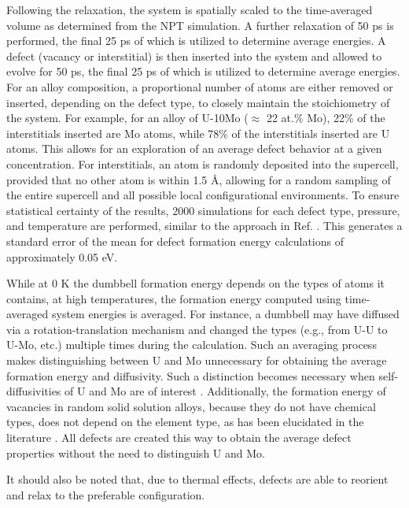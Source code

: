 \documentclass[review]{elsarticle}
\begin{document}
Following the relaxation, the system is spatially scaled to the time-averaged volume as determined from the NPT simulation. A further relaxation of 50 ps is performed, the final 25 ps of which is utilized to determine average energies. A defect (vacancy or interstitial) is then inserted into the system and allowed to evolve for 50 ps, the final 25 ps of which is utilized to determine average energies. For an alloy composition, a proportional number of atoms are either removed or inserted, depending on the defect type, to closely maintain the stoichiometry of the system. For example, for an alloy of U-10Mo ($\approx$ 22 at.\% Mo), 22\% of the interstitials inserted are Mo atoms, while 78\% of the interstitials inserted are U atoms. This allows for an exploration of an average defect behavior at a given concentration. For interstitials, an atom is randomly deposited into the supercell, provided that no other atom is within 1.5 \r{A}, allowing for a random sampling of the entire supercell and all possible local configurational environments. To ensure statistical certainty of the results, 2000 simulations for each defect type, pressure, and temperature are performed, similar to the approach in Ref. \cite{zhang2021}. This generates a standard error of the mean for defect formation energy calculations of approximately 0.05 eV. 

While at 0 K the dumbbell formation energy depends on the types of atoms it contains, at high temperatures, the formation energy computed using time-averaged system energies is averaged. For instance, a dumbbell may have diffused via a rotation-translation mechanism and changed the types (e.g., from U-U to U-Mo, etc.) multiple times during the calculation. Such an averaging process makes distinguishing between U and Mo unnecessary for obtaining the average formation energy and diffusivity. Such a distinction becomes necessary when self-diffusivities of U and Mo are of interest \cite{park2023,Jin2021}. Additionally, the formation energy of vacancies in random solid solution alloys, because they do not have chemical types, does not depend on the element type, as has been elucidated in the literature \cite{zhang2021}. All defects are created this way to obtain the average defect properties without the need to distinguish U and Mo.  

It should also be noted that, due to thermal effects, defects are able to reorient and relax to the preferable configuration.
\end{document}
